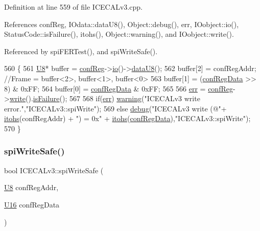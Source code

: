 Definition at line 559 of file I\+C\+E\+C\+A\+Lv3.\+cpp.



References conf\+Reg, I\+Odata\+::data\+U8(), Object\+::debug(), err, I\+Oobject\+::io(), Status\+Code\+::is\+Failure(), itohs(), Object\+::warning(), and I\+Oobject\+::write().



Referenced by spi\+F\+E\+R\+Test(), and spi\+Write\+Safe().


\begin{DoxyCode}
560 \{
561     \hyperlink{ICECALv3_8h_a3cb25ca6f51f003950f9625ff05536fc}{U8}* buffer = \hyperlink{classICECALv3_a6e8b6c03f5b0f1d8281bf8a0fa46064f}{confReg}->\hyperlink{classIOobject_af04fb94137c3d86849f478ac5afab5d1}{io}()->\hyperlink{classIOdata_a75e9c318dbac3a39402179070943d4bc}{dataU8}();
562     buffer[2] = confRegAddr;                                \textcolor{comment}{//Frame = buffer<2>, buffer<1>, buffer<0>}
563     buffer[1] = (\hyperlink{structconfRegData}{confRegData} >> 8) & 0xFF;
564     buffer[0] =  \hyperlink{structconfRegData}{confRegData}       & 0xFF;
565 
566     \hyperlink{classICECALv3_ad8989925ee5b3ff322d863ce6aaff0bd}{err} = \hyperlink{classICECALv3_a6e8b6c03f5b0f1d8281bf8a0fa46064f}{confReg}->\hyperlink{classIOobject_a9f6984bc9f0fadcf800f1be2523ac744}{write}().\hyperlink{classStatusCode_a5dd22dc6eb2c52fc4cabc58f6dea2eb7}{isFailure}();
567 
568     \textcolor{keywordflow}{if}(\hyperlink{classICECALv3_ad8989925ee5b3ff322d863ce6aaff0bd}{err})  \hyperlink{classObject_a65cd4fda577711660821fd2cd5a3b4c9}{warning}(\textcolor{stringliteral}{"ICECALv3 write error."},\textcolor{stringliteral}{"ICECALv3::spiWrite"});
569     \textcolor{keywordflow}{else}      \hyperlink{classObject_aac010553f022165573714b7014a15f0d}{debug}(\textcolor{stringliteral}{"ICECALv3 write (@"}+ \hyperlink{classICECALv3_a04b02e583f191bfce34d05132cd23834}{itohs}(confRegAddr) + \textcolor{stringliteral}{") = 0x"} + 
      \hyperlink{classICECALv3_a04b02e583f191bfce34d05132cd23834}{itohs}(\hyperlink{structconfRegData}{confRegData}),\textcolor{stringliteral}{"ICECALv3::spiWrite"});
570 \}
\end{DoxyCode}
\mbox{\label{classICECALv3_aa0b8358ea0be8e47a8aded5e1551787f}} 
\subsubsection{\texorpdfstring{spi\+Write\+Safe()}{spiWriteSafe()}}
{\footnotesize\ttfamily bool I\+C\+E\+C\+A\+Lv3\+::spi\+Write\+Safe (\begin{DoxyParamCaption}\item[{\hyperlink{ICECALv3_8h_a3cb25ca6f51f003950f9625ff05536fc}{U8}}]{conf\+Reg\+Addr,  }\item[{\hyperlink{ICECALv3_8h_adf928e51a60dba0df29d615401cc55a8}{U16}}]{conf\+Reg\+Data }\end{DoxyParamCaption})\hspace{0.3cm}{\ttfamily [private]}}



